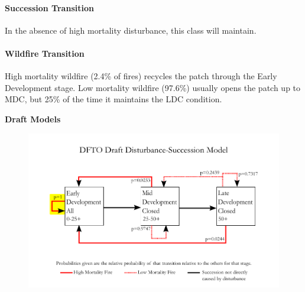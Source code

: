 \documentclass{article}
\newcommand{\mcomment}[1]{\textcolor{navy}{#1}}
\begin{document}
\paragraph{Succession Transition} In the absence of high mortality disturbance, this class will maintain.

\paragraph{Wildfire Transition} High mortality wildfire (2.4\% of fires) recycles the patch through the Early Development stage. Low mortality wildfire (97.6\%) usually opens the patch up to MDC, but 25\% of the time it maintains the LDC condition.


\begin{snugshade}\Large \textbf{Draft Models} \end{snugshade}


\begin{figure}
\includegraphics[width=\textwidth]{DFTO_Draft_1.pdf}
\end{figure}
\end{document}
